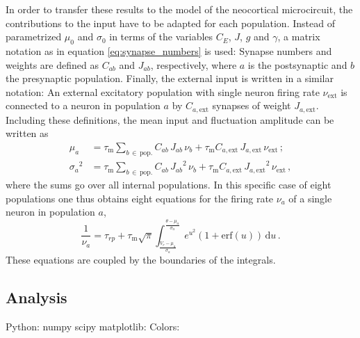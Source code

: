 In order to transfer these results to the model of the neocortical microcircuit, 
the contributions to the input have to be adapted for each population. Instead of 
parametrized $\mu_0$ and $\sigma_0$ in terms of the variables $C_E$, $J$, $g$ and $\gamma$, 
a matrix notation as in equation \eqref{eq:synapse_numbers} is used: 
Synapse numbers and weights are defined as $C_{ab}$ and $J_{ab}$, respectively, 
where $a$ is the postsynaptic and $b$ the presynaptic population. 
Finally, the external input is written in a similar notation: 
An external excitatory population with single neuron firing rate $\nu_\text{ext}$ 
is connected to a neuron in population $a$ by 
$C_{a, \text{ext}}$ synapses of weight $J_{a, \text{ext}}$.
Including these definitions, the mean input and fluctuation amplitude can 
be written as 
\begin{align}
    \mu_a        &= 
        \tau_\text{m} \sum_{b \,\in \,\text{pop.}} C_{ab} \, J_{ab} \, \nu_b 
        + \tau_\text{m} C_{a, \text{ext}} \, J_{a, \text{ext}} \, \nu_\text{ext} \, ; \\
    {\sigma_a}^2 &= 
        \tau_\text{m} \sum_{b \,\in \,\text{pop.}} C_{ab} \, {J_{ab}}^2  \, \nu_b
        + \tau_\text{m} C_{a, \text{ext}} \,{J_{a, \text{ext}}}^2 \,\nu_\text{ext}\,,
\end{align}
where the sums go over all internal populations. In this specific case of eight 
populations one thus obtains eight equations for the 
firing rate $\nu_a$ of a single neuron in population $a$, 
\begin{equation}
    \frac{1}{\nu_{a}} = \tau_{rp} 
        + \tau_\text{m} \sqrt{\pi}
            \int_{\frac{V_r - \mu_{a}}{\sigma_{a}}}^{\frac{\theta - \mu_{a}}{\sigma_{a}}} 
                e^{u^2} \left(1 + \text{erf}(u)\right) \,\text{d}u  \,.
    \label{eq:self_consistency_a}
\end{equation}
These equations are coupled by the boundaries of the integrals. 





\subsection{Analysis}
Python: \cite{python}
numpy scipy \cite{scipy}
matplotlib: \cite{matplotlib}
Colors: \cite{brewercolor}
